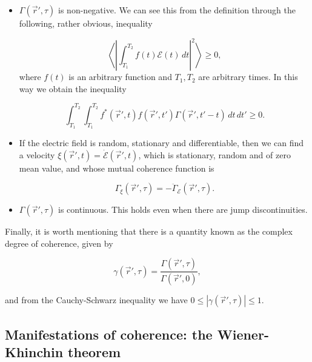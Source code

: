 \begin{itemize}
		\item[d)] $\Gamma(\vec{r}',\tau)$ is non-negative. We can see this from the definition through the following, rather obvious, inequality

		\begin{equation}
			\left\langle \left| \int_{T_1}^{T_2} f(t)\mathcal{E}(t)\,dt \right|^2\right\rangle \geq 0,
		\end{equation}
		where $f(t)$ is an arbitrary function and $T_1,T_2$ are arbitrary times. In this way we obtain the inequality

		\begin{equation}
			\int_{T_1}^{T_2}\int_{T_1}^{T_2} f^*(\vec{r}',t)f(\vec{r}',t')\Gamma(\vec{r}',t'-t)\,dt\,dt' \geq 0.
		\end{equation}

		\item[e)] If the electric field is random, stationary and differentiable, then we can find a velocity $\xi (\vec{r}',t) = \dot{\mathcal{E}}(\vec{r}',t)$, which is stationary, random and of zero mean value, and whose mutual coherence function is

		\begin{equation}
			\Gamma_\xi(\vec{r}',\tau) = - \ddot{\Gamma}_\mathcal{E}(\vec{r}',\tau).
		\end{equation}

		\item[f)] $\Gamma(\vec{r}',\tau)$ is continuous. This holds even when there are jump discontinuities.
	\end{itemize}

	Finally, it is worth mentioning that there is a quantity known as the complex degree of
	coherence, given by

	\begin{equation}
		\gamma (\vec{r}',\tau) = \frac{\Gamma(\vec{r}',\tau)}{\Gamma(\vec{r}',0)},
	\end{equation}

	and from the Cauchy-Schwarz inequality we have $0 \leq |\gamma(\vec{r}',\tau)| \leq 1$.

	\subsection{Manifestations of coherence: the Wiener-Khinchin theorem}

